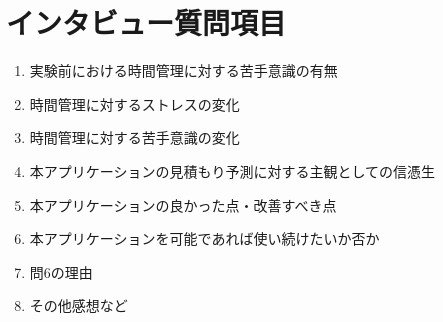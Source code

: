 \chapter{インタビュー質問項目}
  \begin{enumerate}
  \item 実験前における時間管理に対する苦手意識の有無
  \item 時間管理に対するストレスの変化
  \item 時間管理に対する苦手意識の変化
  \item 本アプリケーションの見積もり予測に対する主観としての信憑生
  \item 本アプリケーションの良かった点・改善すべき点
  \item 本アプリケーションを可能であれば使い続けたいか否か
  \item 問6の理由
  \item その他感想など
\end{enumerate}
